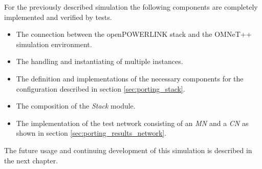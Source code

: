 For the previously described simulation the following components are completely implemented and verified by tests.

\begin{itemize}
    \item The connection between the openPOWERLINK stack and the OMNeT++ simulation environment.
    \item The handling and instantiating of multiple instances.
    \item The definition and implementations of the necessary components for the configuration described in section \ref{sec:porting_stack}.
    \item The composition of the \emph{Stack} module.
    \item The implementation of the test network consisting of an \emph{MN} and a \emph{CN} as shown in section \ref{sec:porting_results_network}.
\end{itemize}

The future usage and continuing development of this simulation is described in the next chapter.